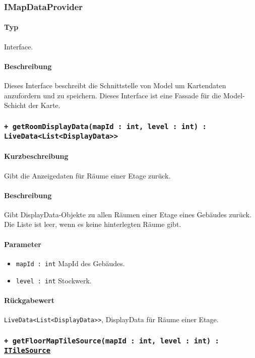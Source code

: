 \subsubsection{IMapDataProvider}
\paragraph*{Typ}
Interface.
\paragraph*{Beschreibung}
Dieses Interface beschreibt die Schnittstelle von Model um Kartendaten anzufordern und zu speichern.
Dieses Interface ist eine Fassade für die Model-Schicht der Karte.

\subsubsection*{\texttt{+ getRoomDisplayData(mapId : int, level : int) : LiveData<List<DisplayData>>}}%
\paragraph*{Kurzbeschreibung}
Gibt die Anzeigedaten für Räume einer Etage zurück.
\paragraph*{Beschreibung}
Gibt DisplayData-Objekte zu allen Räumen einer Etage eines Gebäudes zurück.\\
Die Liste ist leer, wenn es keine hinterlegten Räume gibt.
\paragraph*{Parameter}
\begin{itemize}
    \item \texttt{mapId : int} MapId des Gebäudes.
    \item \texttt{level : int} Stockwerk.
\end{itemize}
\paragraph*{Rückgabewert}
\texttt{LiveData<List<DisplayData>>}, DisplayData für Räume einer Etage.

\subsubsection*{\texttt{+ getFloorMapTileSource(mapId : int, level : int) : \href{https://osmdroid.github.io/osmdroid/javadocAll/org/osmdroid/tileprovider/tilesource/ITileSource.html}
{ITileSource}}}%
